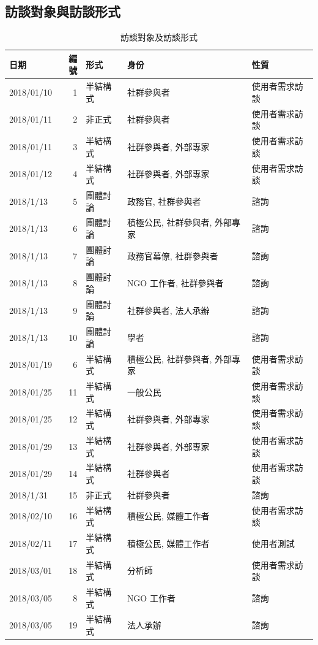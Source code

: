 \documentclass[12pt,a4paper]{article}
\begin{document}
\subsection{訪談對象與訪談形式}
\label{sec:org62782c2}
\begin{table}[htbp]
\caption{\label{tab:org4c4066a}
訪談對象及訪談形式}
\centering
{}
\begin{tabular}{lrlll}
\toprule
日期 & 編號 & 形式 & 身份 & 性質\\
\midrule
2018/01/10 & 1 & 半結構式 & 社群參與者 & 使用者需求訪談\\
2018/01/11 & 2 & 非正式 & 社群參與者 & 使用者需求訪談\\
2018/01/11 & 3 & 半結構式 & 社群參與者, 外部專家 & 使用者需求訪談\\
2018/01/12 & 4 & 半結構式 & 社群參與者, 外部專家 & 使用者需求訪談\\
2018/1/13 & 5 & 團體討論 & 政務官, 社群參與者 & 諮詢\\
2018/1/13 & 6 & 團體討論 & 積極公民, 社群參與者, 外部專家 & 諮詢\\
2018/1/13 & 7 & 團體討論 & 政務官幕僚, 社群參與者 & 諮詢\\
2018/1/13 & 8 & 團體討論 & NGO 工作者, 社群參與者 & 諮詢\\
2018/1/13 & 9 & 團體討論 & 社群參與者, 法人承辦 & 諮詢\\
2018/1/13 & 10 & 團體討論 & 學者 & 諮詢\\
2018/01/19 & 6 & 半結構式 & 積極公民, 社群參與者, 外部專家 & 使用者需求訪談\\
2018/01/25 & 11 & 半結構式 & 一般公民 & 使用者需求訪談\\
2018/01/25 & 12 & 半結構式 & 社群參與者, 外部專家 & 使用者需求訪談\\
2018/01/29 & 13 & 半結構式 & 社群參與者, 外部專家 & 使用者需求訪談\\
2018/01/29 & 14 & 半結構式 & 社群參與者 & 使用者需求訪談\\
2018/1/31 & 15 & 非正式 & 社群參與者 & 諮詢\\
2018/02/10 & 16 & 半結構式 & 積極公民, 媒體工作者 & 使用者需求訪談\\
2018/02/11 & 17 & 半結構式 & 積極公民, 媒體工作者 & 使用者測試\\
2018/03/01 & 18 & 半結構式 & 分析師 & 使用者需求訪談\\
2018/03/05 & 8 & 半結構式 & NGO 工作者 & 諮詢\\
2018/03/05 & 19 & 半結構式 & 法人承辦 & 諮詢\\

\end{tabular}
\end{table}
\end{document}
